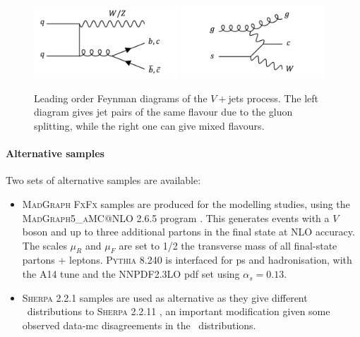 \begin{figure}[h!]
  \center
  \includegraphics[width=0.48\textwidth]{Images/VH/Feynman/vjet.png}
  \includegraphics[width=0.48\textwidth]{Images/VH/Feynman/vjet2.png}
  \caption{Leading order Feynman diagrams of the $V+$jets process. The left diagram gives jet pairs of the same flavour due to the gluon splitting, while the right one can give mixed flavours.} 
  \label{fig:feynVJ}
\end{figure}

\paragraph{Alternative samples} Two sets of alternative samples are available:
\begin{itemize}
  \item \textsc{MadGraph FxFx} \cite{Frederix:2012ps} samples are produced for the modelling studies, using the \textsc{MadGraph5\_aMC@NLO} 2.6.5 program \cite{madgraph}. This generates events with a $V$ boson and up to three additional partons in the final state at NLO accuracy. The scales $\mu_R$ and $\mu_F$ are set to 1/2 the transverse mass of all final-state partons + leptons. \textsc{Pythia} 8.240 is interfaced for \gls{ps} and hadronisation, with the A14 tune \cite{ATL-PHYS-PUB-2014-021} and the NNPDF2.3LO \gls{pdf} \cite{BALL2013244} set using $\alpha_s = 0.13$.
  \item \textsc{Sherpa} 2.2.1 \cite{sherpa2.2paper} samples are used as alternative as they give different \ptv\ distributions to \textsc{Sherpa} 2.2.11 \cite{simVjet}, an important modification given some observed data-\gls{mc} disagreements in the \ptv\ distributions.
\end{itemize}

